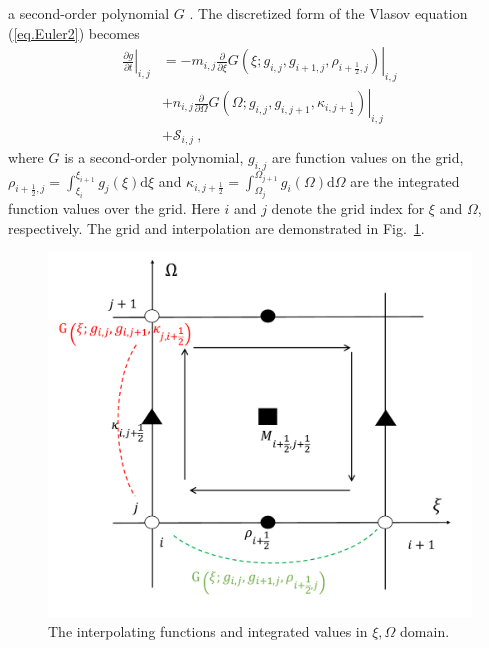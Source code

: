 \documentclass[times,12pt,3p,longtitle]{elsarticle}
\begin{document}
a second-order  polynomial $G$ \cite{imadera2009}. 
The discretized form of the Vlasov equation (\ref{eq.Euler2}) becomes
\begin{equation}\label{eq.disV}
    \begin{aligned}
    \left.\frac{\partial g}{\partial t}\right|_{i,j}   & =  - m_{i,j} \left.\frac{\partial}{\partial \xi} G\left(\xi;g_{i,j},g_{i+1,j},\rho_{i+\frac{1}{2},j}\right)\right|_{i,j} 
    \\
    & + n_{i,j}  \left.\frac{\partial}{\partial \Omega}G\left(\Omega;g_{i,j},g_{i,j+1},\kappa_{i,j+\frac{1}{2}}\right)\right|_{i,j}
    \\
    & +  \mathcal{S}_{i,j}~,
    \end{aligned}
\end{equation}
where $G$ is a second-order  polynomial, $g_{i,j} $ are function values on the grid,  
$\rho_{i+\frac{1}{2},j}=\int_{\xi_i}^{\xi_{i+1}}g_{j}(\xi)\mathrm{d}\xi$ and $\kappa_{i,j+\frac{1}{2}}=\int_{\Omega_j}^{\Omega_{j+1}}g_{i}(\Omega)\mathrm{d}\Omega$
are the integrated function values over the grid.
Here $i$ and $j$ denote the grid index for $\xi$ and $\Omega$, respectively. 
The grid and interpolation are demonstrated in Fig.~\ref{fig.grids}.
\begin{figure}[htbp]
    \centering
    \includegraphics[scale=0.3]{IDO.pdf}
    \caption{The interpolating functions and  integrated values in $\xi,\Omega$ domain.}
    \label{fig.grids}
\end{figure}
\end{document}
